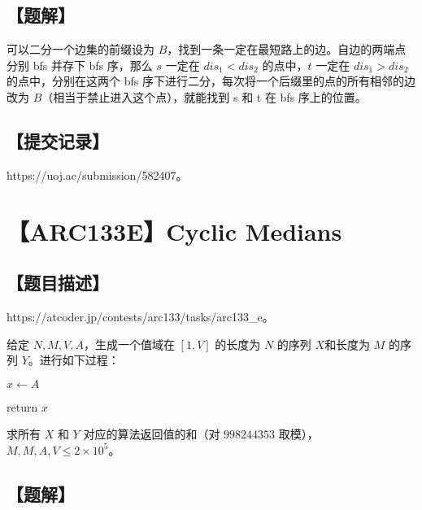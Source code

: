 \documentclass[UTF8,12pt,a4paper]{ctexart}
\begin{document}
	\subsection*{【题解】}
	
	可以二分一个边集的前缀设为 $B$，找到一条一定在最短路上的边。自边的两端点分别 bfs 并存下 bfs 序，那么 $s$ 一定在 $dis_1<dis_2$ 的点中，$t$ 一定在 $dis_1>dis_2$ 的点中，分别在这两个 bfs 序下进行二分，每次将一个后缀里的点的所有相邻的边改为 $B$（相当于禁止进入这个点），就能找到 s 和 t 在 bfs 序上的位置。
		
	\subsection*{【提交记录】}
	
	https://uoj.ac/submission/582407。
	
	
	\section*{【ARC133E】Cyclic Medians}
	
	\subsection*{【题目描述】}
	
	https://atcoder.jp/contests/arc133/tasks/arc133\_e。
	
	给定 $N,M,V,A$，生成一个值域在 $[1,V]$ 的长度为 $N$ 的序列 $X$和长度为 $M$ 的序列 $Y$。进行如下过程：
	
	
	\begin{algorithm}

		$x \leftarrow A$\;
		
		
		return $x$\;

	\end{algorithm}

	求所有 $X$ 和 $Y$ 对应的算法返回值的和（对 $998244353$ 取模），$M,M,A,V\le 2\times 10^5$。
	
	\subsection*{【题解】}
	
\end{document}
